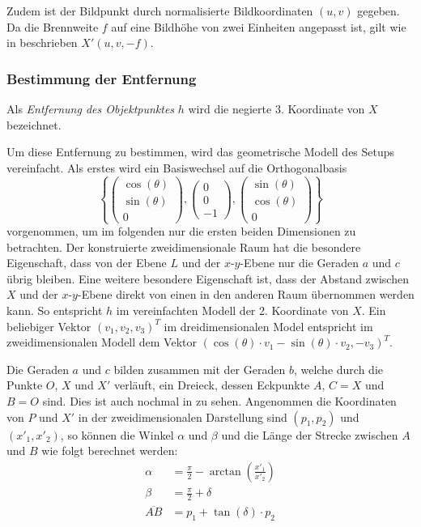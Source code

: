 \documentclass[ngerman,a4paper,parskip=half]{scrartcl}
\begin{document}
Zudem ist der Bildpunkt durch normalisierte Bildkoordinaten $(u, v)$ gegeben. Da die Brennweite $f$ auf eine Bildhöhe von zwei Einheiten angepasst ist, gilt wie in  beschrieben $X'(u, v, -f)$.

\subsubsection{Bestimmung der Entfernung}

Als \emph{Entfernung des Objektpunktes} $h$ wird die negierte 3. Koordinate von $X$ bezeichnet.

Um diese Entfernung zu bestimmen, wird das geometrische Modell des Setups vereinfacht. Als erstes wird ein Basiswechsel auf die Orthogonalbasis
\[ \left\lbrace \begin{pmatrix}
\cos(\theta) \\ \sin(\theta) \\ 0
\end{pmatrix}, \begin{pmatrix}
0 \\ 0 \\ -1
\end{pmatrix}, \begin{pmatrix}
\sin(\theta) \\ \cos(\theta) \\ 0
\end{pmatrix} \right\rbrace \]
vorgenommen, um im folgenden nur die ersten beiden Dimensionen zu betrachten. Der konstruierte zweidimensionale Raum hat die besondere Eigenschaft, dass von der Ebene $L$ und der $x$-$y$-Ebene nur die Geraden $a$ und $c$ übrig bleiben. Eine weitere besondere Eigenschaft ist, dass der Abstand zwischen $X$ und der $x$-$y$-Ebene direkt von einen in den anderen Raum übernommen werden kann. So entspricht $h$ im vereinfachten Modell der 2. Koordinate von $X$. Ein beliebiger Vektor $(v_1, v_2, v_3)^T$ im dreidimensionalen Model entspricht im zweidimensionalen Modell dem Vektor $(\cos(\theta) \cdot v_1 - \sin(\theta) \cdot v_2, -v_3)^T$.

Die Geraden $a$ und $c$ bilden zusammen mit der Geraden $b$, welche durch die Punkte $O$, $X$ und $X'$ verläuft, ein Dreieck, dessen Eckpunkte $A$, $C = X$ und $B = O$ sind. Dies ist auch nochmal in  zu sehen. Angenommen die Koordinaten von $P$ und $X'$ in der zweidimensionalen Darstellung sind $(p_1,p_2)$ und $(x'_1, x'_2)$, so können die Winkel $\alpha$ und $\beta$ und die Länge der Strecke zwischen $A$ und $B$ wie folgt berechnet werden:
\begin{align*}
	\alpha &= \frac{\pi}{2} - \arctan\left(\frac{x'_1}{x'_2}\right)\\
	\beta &= \frac{\pi}{2} + \delta\\
	\overline{AB} &= p_1 + \tan(\delta) \cdot p_2
\end{align*}
\end{document}
